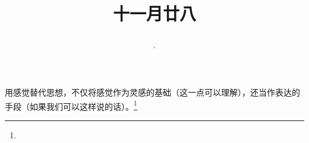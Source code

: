 \title{\date[d=9,m=1,y=2024][year:cn-y,年,month:cn,day:cn,日,·,weekday]·十一月廿八 }
用感觉替代思想，不仅将感觉作为灵感的基础（这一点可以理解），还当作表达的手段（如果我们可以这样说的话）。\footnote{ }

